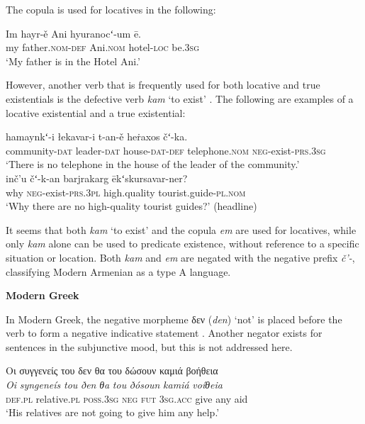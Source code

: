 \documentclass[output=paper]{langsci/langscibook}
\begin{document}
\begin{unindented}
The copula is used for locatives in the following:
%
\begin{exe}\ex \gll Im hayr-ě Ani hyuranocʻ-um ē.  \\
my father.\textsc{nom}-\textsc{def} Ani.\textsc{nom} hotel-\textsc{loc} be.\textsc{3sg} \\
    \glt `My father is in the Hotel Ani.' \parencite[382]{DumTragut2009}
    \end{exe}

However, another verb that is frequently used for both locative and true
existentials is the defective verb \textit{kam} `to exist' \parencite[282]{DumTragut2009}. The following are examples of a locative existential and a true existential:
%
\begin{exe}\ex \gll hamaynkʻ-i łekavar-i t-an-ě heṙaxos čʻ-ka.  \\
community-\textsc{dat} leader-\textsc{dat} house-\textsc{dat-def} 
telephone.\textsc{nom} \textsc{neg}-exist-\textsc{prs.3sg} \\
    \glt `There is no telephone in the house of the leader of the
community.' \\
\parencite[104--105]{DumTragut2009}
\ex \gll inč’u čʻ-k-an barjrakarg ēkʻskursavar-ner?  \\
why \textsc{neg}-exist-\textsc{prs.3pl} high.quality tourist.guide-\textsc{pl.nom} \\
    \glt `Why there are no high-quality tourist guides?' (headline)
\parencite[693]{DumTragut2009}
    \end{exe}

It seems that both \textit{kam} `to exist' and the copula \textit{em} are used for locatives, while only \textit{kam} alone can be used to predicate existence, without reference to a specific situation or location. Both \textit{kam} and \textit{em} are negated with the negative prefix \textit{č’-}, classifying Modern Armenian as a type A language. 

\textbf{Modern Greek}

In Modern Greek, the negative morpheme δεν
(\textit{den}) `not' is placed before the verb to form a negative
indicative statement \parencite[510]{HoltonMackridge2012}. Another negator exists for sentences in the subjunctive mood, but this is not addressed here. 
%
\begin{exe}\ex \glll
Οι συγγενείς του δεν θα του δώσουν καμιά βοήθεια \\
\textit{Oi} \textit{syngeneís} \textit{tou} \textit{ðen} \textit{θa} \textit{tou} \textit{ðósoun} \textit{kamiá} \textit{voíθeia}\\
\textsc{def.pl}  relative.\textsc{pl} \textsc{poss.3sg} \textsc{neg}  \textsc{fut} \textsc{3sg.acc} give any aid \\
    \glt `His relatives are not going to give him any help.' \parencite[510]{HoltonMackridge2012}
    \end{exe}


\end{unindented}
\end{document}
